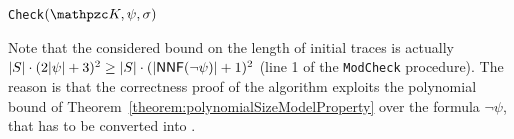 \begin{algorithm}[p]
\begin{algorithmic}[1]
	    \EndIf
	\ElsIf{$\psi=\neg\varphi$}
	    \Else
	    \EndIf
	\ElsIf{$\psi=\hsA\varphi$}%
	        \EndIf
	    \EndFor
	\ElsIf{$\psi=\hsE\varphi$}%
	        \EndIf
	    \EndFor
	\ElsIf{$\psi=\hsEt\varphi$}
            \EndIf
        \EndFor
	\EndIf
	\State{\dots}
\end{algorithmic}
\caption{\texttt{Check}$(\Ku,\psi,\sigma)$}\label{Chk2}
\end{algorithm}

Note that the considered bound on the length of initial traces is actually  $|S|\cdot (2|\psi|+3)^2\geq |S|\cdot (|\textsf{NNF}(\neg\psi)|+1)^2$ (line 1 of the \texttt{ModCheck} procedure).
The reason is that the correctness proof of the algorithm exploits the polynomial bound of Theorem~\ref{theorem:polynomialSizeModelProperty} over the formula $\neg\psi$, that has to be converted into \nnf .



